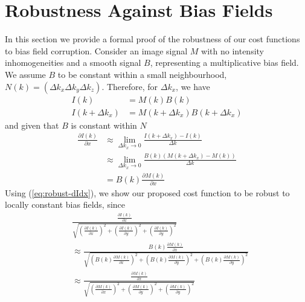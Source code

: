 \def\kdeltak{k + \Delta k_x}
\newcommand{\IPartial}[1]{\frac{\partial I(k)}{\partial #1}}
\newcommand{\BPartialM}[1]{B(k) \frac{\partial M (k)}{\partial #1}}
\newcommand{\PartialM}[1]{\frac{\partial M (k)}{\partial #1}}

\section{Robustness Against Bias Fields}\label{sec:robustness}
In this section we provide a formal proof of the robustness of our cost functions to bias field corruption. Consider an image signal $M$ with no intensity inhomogeneities and a smooth signal $B$, representing a multiplicative bias field. We assume $B$ to be constant within a small neighbourhood, $N(k) = \left( \Delta k_x \Delta k_y \Delta k_z \right)$. Therefore, for $\Delta k_x$, we have
\begin{equation}
    \begin{aligned}\label{eq:robust-I}
        I(k) &= M(k) B(k) \\
        I(\kdeltak) &= M(\kdeltak) B(\kdeltak)
    \end{aligned}
\end{equation}
and given that $B$ is constant within $N$
\begin{equation}
    \begin{aligned}\label{eq:robust-dIdx}
        \frac{\partial I(k)}{\partial x} &\approx \lim_{\Delta k_x \to 0} \frac{I(\kdeltak) - I(k)}{\Delta k} \\
        &\approx \lim_{\Delta k_x \to 0} \frac{B(k) (M(\kdeltak) - M(k))}{\Delta k} \\
        &= B(k) \frac{\partial M(k)}{\partial x}
    \end{aligned}
\end{equation}
Using (\ref{eq:robust-dIdx}), we show our proposed cost function to be robust to locally constant bias fields, since
\begin{equation}
    \begin{aligned}\label{eq:robust-cost-function}
        &\frac{\IPartial{x}}{\sqrt{(\IPartial{x})^2 + (\IPartial{y})^2 + (\IPartial{y})^2}} \\
        &\approx \frac{\BPartialM{x}}{\sqrt{(\BPartialM{x})^2 + (\BPartialM{y})^2 + (\BPartialM{y})^2}} \\
        &\approx \frac{\PartialM{x}}{\sqrt{(\PartialM{x})^2 + (\PartialM{y})^2 + (\PartialM{y})^2}}
    \end{aligned}
\end{equation}
